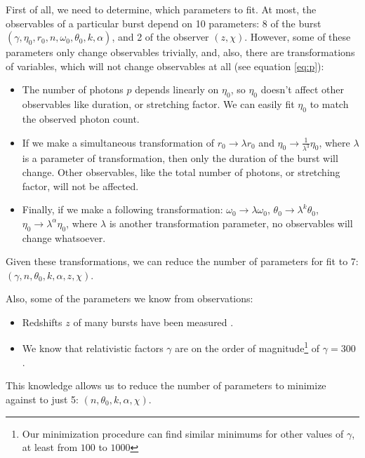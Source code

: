 \documentclass{article}
\begin{document}
First of all, we need to determine, which parameters to fit. At most, the observables of a particular burst depend on 10 parameters: 8 of the burst $\left(\gamma, \eta_0, r_0, n, \omega_0, \theta_0, k, \alpha\right)$, and 2 of the observer $\left(z, \chi\right)$. However, some of these parameters only change observables trivially, and, also, there are transformations of variables, which will not change observables at all (see equation \ref{eq:p}):
\begin{itemize}
	\item{The number of photons $p$ depends linearly on $\eta_0$, so $\eta_0$ doesn't affect other observables like duration, or stretching factor. We can easily fit $\eta_0$ to match the observed photon count.}
	\item{If we make a simultaneous transformation of $r_0 \rightarrow \lambda r_0$ and $\eta_0 \rightarrow \frac{1}{\lambda^3}\eta_0$, where $\lambda$ is a parameter of transformation, then only the duration of the burst will change. Other observables, like the total number of photons, or stretching factor, will not be affected.}
	\item{Finally, if we make a following transformation: $\omega_0 \rightarrow \lambda \omega_0$, $\theta_0 \rightarrow \lambda^k \theta_0$, $\eta_0 \rightarrow \lambda^\alpha \eta_0$, where $\lambda$ is another transformation parameter, no observables will change whatsoever.}
\end{itemize}
Given these transformations, we can reduce the number of parameters for fit to 7: $\left(\gamma, n, \theta_0, k, \alpha, z, \chi\right)$.

Also, some of the parameters we know from observations:
\begin{itemize}
	\item{Redshifts $z$ of many bursts have been measured \cite{Ackermann:2013zfa}.}
	\item{We know that relativistic factors $\gamma$ are on the order of magnitude\footnote{Our minimization procedure can find similar minimums for other values of $\gamma$, at least from $100$ to $1000$} of $\gamma = 300$ \cite{Ghirlanda:2011ux}.}
\end{itemize}
This knowledge allows us to reduce the number of parameters to minimize against to just 5: $\left(n, \theta_0, k, \alpha, \chi\right)$.
\end{document}
